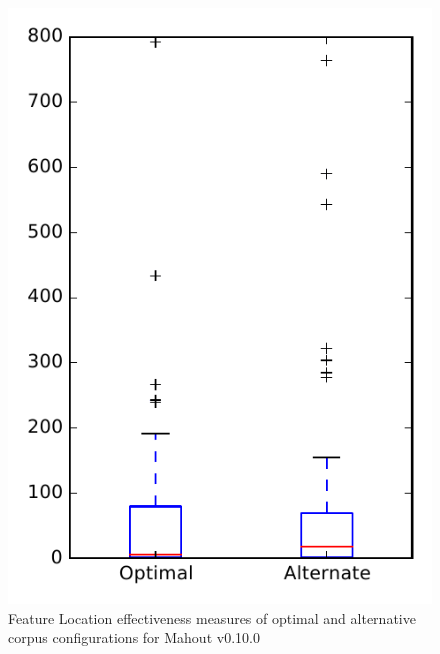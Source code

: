 
\begin{figure}
\centering
\includegraphics[height=0.4\textheight]{figures/combo/flt_rq2_mahout}
\caption{Feature Location effectiveness measures of optimal and alternative corpus configurations for Mahout v0.10.0}
\label{fig:combo:flt:rq2:mahout}
\end{figure}
